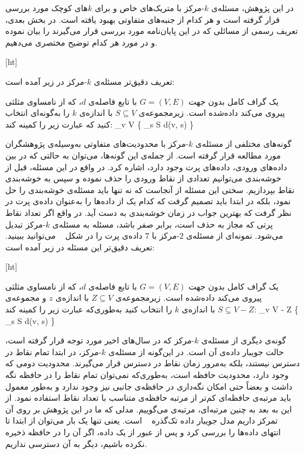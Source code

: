 در این پژوهش، مسئله‌ی $k$-مرکز با متریک‌های خاص و برای $k$های کوچک مورد بررسی قرار گرفته است و هر کدام از‌ جنبه‌های متفاوتی بهبود یافته است.
در بخش بعدی، تعریف رسمی از مسائلی که در این پایان‌نامه مورد بررسی قرار می‌گیرند را بیان نموده و در مورد هر کدام توضیح مختصری می‌دهیم.

[ht]


تعریف دقیق‌تر مسئله‌ی $k$-مرکز در زیر آمده است:

 یک گراف کامل بدون جهت $G = (V, E)$ با تابع فاصله‌ی $d$، که از نامساوی مثلثی پیروی می‌کند داده‌شده است.
زیرمجموعه‌ی $S \subseteq V$ با اندازه‌ی $k$ را به‌گونه‌ای انتخاب کنید که عبارت زیر را کمینه کند:
\max_{v \in V} \{ \min_{s \in S} d(v, s) \}

گونه‌های مختلفی از مسئله‌ی $k$-مرکز با محدودیت‌های متفاوتی به‌وسیله‌ی پژوهشگران مورد مطالعه قرار گرفته است.
از جمله‌ی این گونه‌ها، می‌توان به حالتی که در بین داده‌های ورودی، داده‌های پرت وجود دارد، اشاره کرد.
در واقع در این مسئله، قبل از خوشه‌بندی می‌توانیم تعدادی از نقاط ورودی را حذف نموده و سپس به خوشه‌بندی نقاط بپردازیم.
سختی این مسئله از آنجاست که نه تنها باید مسئله‌ی خوشه‌بندی را حل نمود، بلکه در ابتدا باید تصمیم گرفت که کدام یک از داده‌ها را به‌عنوان داده‌ی پرت در نظر گرفت که بهترین جواب در زمان خوشه‌بندی به دست آید.
در واقع اگر تعداد نقاط پرتی که مجاز به حذف است، برابر صفر باشد، مسئله به مسئله‌ی $k$-مرکز تبدیل می‌شود.
نمونه‌ای از مسئله‌ی $2$-مرکز با $7$ داده‌ی پرت را در شکل ~ می‌توانید ببینید.
تعریف دقیق‌تر این مسئله در زیر آمده است:

[ht]


 یک گراف کامل بدون جهت $G = (V, E)$ با تابع فاصله‌ی $d$، که از نامساوی مثلثی پیروی می‌کند داده‌شده است.
زیرمجموعه‌ی $Z \subseteq V$ با اندازه‌ی $z$ و  مجموعه‌ی $S \subseteq V - Z$ با اندازه‌ی $k$ را انتخاب کنید به‌طوری‌که عبارت زیر را کمینه کند:
\max_{v \in V - Z} \{ \min_{s \in S} d(v, s) \}

گونه‌ی دیگری از مسئله‌ی $k$-مرکز که در سال‌های اخیر مورد توجه قرار گرفته است، حالت جویبار داده‌ی آن است.
در این‌گونه از مسئله‌ی $k$-مرکز، در ابتدا تمام نقاط در دسترس نیستند، بلکه به‌مرور زمان نقاط در دسترس قرار می‌گیرند.
محدودیت دومی که وجود دارد، محدودیت حافظه است، به‌طوری‌که نمی‌توان تمام نقاط را در حافظه نگه داشت و بعضاً حتی امکان نگه‌داری در حافظه‌ی جانبی نیز وجود ندارد و به‌طور معمول باید مرتبه‌ی حافظه‌ای کم‌تر از مرتبه حافظه‌ی  متناسب با تعداد نقاط استفاده نمود.
از این به بعد به چنین مرتبه‌ای، مرتبه‌ی  می‌گوییم.
مدلی که ما در این پژوهش بر روی آن تمرکز داریم مدل جویبار داده تک‌گذره ~ است.
یعنی تنها یک بار می‌توان از ابتدا تا انتهای داده‌ها را بررسی کرد و پس از عبور از یک داده، اگر آن را در حافظه ذخیره نکرده باشیم، دیگر به آن دسترسی نداریم.

